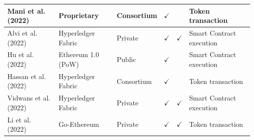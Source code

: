 \documentclass[../access.tex]{subfiles}
\begin{document}
\begin{table}[htbp]
\begin{adjustwidth}{-1cm}{}
\begin{tabular}{m{4.4cm} >{\centering\arraybackslash}m{2.9cm} >{\centering\arraybackslash}m{1.0cm} >{\centering\arraybackslash}m{1.0cm} >{\centering\arraybackslash}m{1.5cm} >{\centering\arraybackslash}m{3.6cm}}
                    \hline
                    \footnotesize{Mani et al. (2022) \cite{Mani2022}} & \footnotesize{Proprietary} & \footnotesize{Consortium} & $ \checkmark $ & {} & \footnotesize{Token transaction} \\
                    \hline
                    \footnotesize{Alvi et al. (2022) \cite{Alvi2022}} & \footnotesize{Hyperledger Fabric} & \footnotesize{Private} & $ \checkmark $ & $ \checkmark $ & \footnotesize{Smart Contract execution} \\
                    \hline
                    \footnotesize{Hu et al. (2022) \cite{Hu2022}} & \footnotesize{Ethereum 1.0 (PoW)} & \footnotesize{Public} & $ \checkmark $ & {} & \footnotesize{Smart Contract execution} \\
                    \hline
                    \footnotesize{Hassan et al. (2022) \cite{Hassan2022}} & \footnotesize{Hyperledger Fabric} & \footnotesize{Consortium} & $ \checkmark $ & {} & \footnotesize{Token transaction} \\
                    \hline
                    \footnotesize{Vidwans et al. (2022) \cite{Vidwans2022}} & \footnotesize{Hyperledger Fabric} & \footnotesize{Private} & $ \checkmark $ & $ \checkmark $ & \footnotesize{Smart Contract execution} \\
                    \hline
                    \footnotesize{Li et al. (2022) \cite{Li2022}} & \footnotesize{Go-Ethereum} & \footnotesize{Private} & $ \checkmark $ & $ \checkmark $ & \footnotesize{Token transaction} \\
                    \bottomrule
                \end{tabular}
            \end{adjustwidth}
        \label{tbl:table7}
    \end{table}
\end{document}
